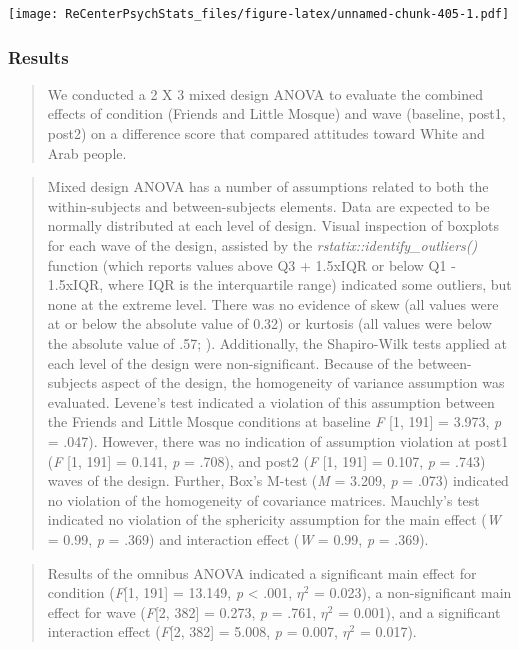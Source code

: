 \documentclass[
  11pt,
]{book}
\begin{document}
\texttt{[image: ReCenterPsychStats\_files/figure-latex/unnamed-chunk-405-1.pdf]}

\hypertarget{results}{%
\subsubsection{Results}\label{results}}

\begin{quote}
We conducted a 2 X 3 mixed design ANOVA to evaluate the combined effects of condition (Friends and Little Mosque) and wave (baseline, post1, post2) on a difference score that compared attitudes toward White and Arab people.
\end{quote}

\begin{quote}
Mixed design ANOVA has a number of assumptions related to both the within-subjects and between-subjects elements. Data are expected to be normally distributed at each level of design. Visual inspection of boxplots for each wave of the design, assisted by the \emph{rstatix::identify\_outliers()} function (which reports values above Q3 + 1.5xIQR or below Q1 - 1.5xIQR, where IQR is the interquartile range) indicated some outliers, but none at the extreme level. There was no evidence of skew (all values were at or below the absolute value of 0.32) or kurtosis (all values were below the absolute value of .57; \citep{kline_principles_2016}). Additionally, the Shapiro-Wilk tests applied at each level of the design were non-significant. Because of the between-subjects aspect of the design, the homogeneity of variance assumption was evaluated. Levene's test indicated a violation of this assumption between the Friends and Little Mosque conditions at baseline \emph{F} {[}1, 191{]} = 3.973, \emph{p} = .047). However, there was no indication of assumption violation at post1 (\emph{F} {[}1, 191{]} = 0.141, \emph{p} = .708), and post2 (\emph{F} {[}1, 191{]} = 0.107, \emph{p} = .743) waves of the design. Further, Box's M-test (\emph{M} = 3.209, \emph{p} = .073) indicated no violation of the homogeneity of covariance matrices. Mauchly's test indicated no violation of the sphericity assumption for the main effect (\emph{W} = 0.99, \emph{p} = .369) and interaction effect (\emph{W} = 0.99, \emph{p} = .369).
\end{quote}

\begin{quote}
Results of the omnibus ANOVA indicated a significant main effect for condition (\emph{F}{[}1, 191{]} = 13.149, \emph{p} \textless{} .001, \(\eta^{2}\) = 0.023), a non-significant main effect for wave (\emph{F}{[}2, 382{]} = 0.273, \emph{p} = .761, \(\eta^{2}\) = 0.001), and a significant interaction effect (\emph{F}{[}2, 382{]} = 5.008, \emph{p} = 0.007, \(\eta^{2}\) = 0.017).
\end{quote}
\end{document}
